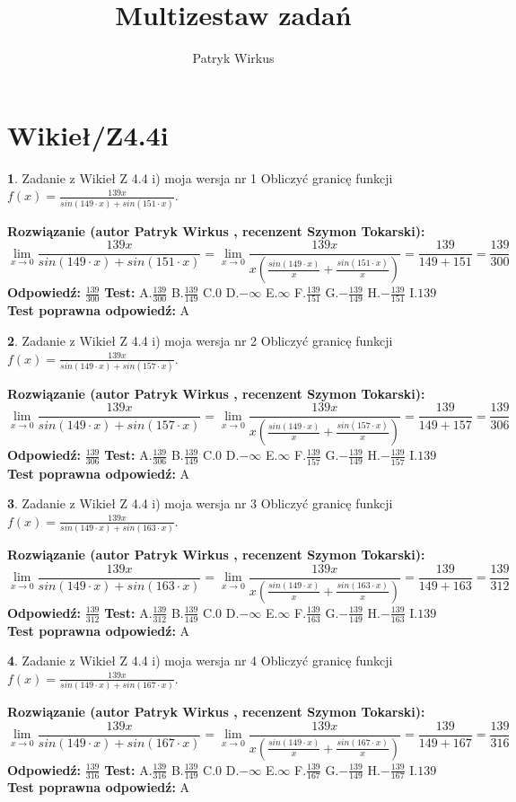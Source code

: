 \documentclass[12pt, a4paper]{article}
\title{Multizestaw zadań}
\author{Patryk Wirkus}
\date{}
\theoremstyle{definition} %
\newtheorem{zad}{}
\newcommand{\kategoria}[1]{\section{#1}}
\newcommand{\zadStart}[1]{\begin{zad}#1\newline}
\newcommand{\zadStop}{\end{zad}}
\newcommand{\rozwStart}[2]{\noindent \textbf{Rozwiązanie (autor #1 , recenzent #2): }\newline}
\newcommand{\rozwStop}{\newline}
\newcommand{\odpStart}{\noindent \textbf{Odpowiedź:}\newline}
\newcommand{\odpStop}{\newline}
\newcommand{\testStart}{\noindent \textbf{Test:}\newline}
\newcommand{\testStop}{\newline}
\newcommand{\kluczStart}{\noindent \textbf{Test poprawna odpowiedź:}\newline}
\newcommand{\kluczStop}{\newline}
\begin{document}
\maketitle

\kategoria{Wikieł/Z4.4i}


\zadStart{Zadanie z Wikieł Z 4.4 i) moja wersja nr 1}
Obliczyć granicę funkcji $f(x)=\frac{139x}{sin(149\cdot x) +sin(151\cdot x)}$.
\zadStop
\rozwStart{Patryk Wirkus}{Szymon Tokarski}
$$\lim\limits_{x\to 0}\frac{139x}{sin(149\cdot x) +sin(151\cdot x)}=\lim\limits_{x\to 0}\frac{139x}{x(\frac{sin(149\cdot x)}{x}+\frac{sin(151\cdot x)}{x})}=\frac{139}{149+151} = \frac{139}{300}$$
\rozwStop
\odpStart
$\frac{139}{300}$
\odpStop
\testStart
A.$\frac{139}{300}$
B.$\frac{139}{149}$
C.$0$
D.$-\infty$
E.$\infty$
F.$\frac{139}{151}$
G.$-\frac{139}{149}$
H.$-\frac{139}{151}$
I.$139$
\testStop
\kluczStart
A
\kluczStop



\zadStart{Zadanie z Wikieł Z 4.4 i) moja wersja nr 2}
Obliczyć granicę funkcji $f(x)=\frac{139x}{sin(149\cdot x) +sin(157\cdot x)}$.
\zadStop
\rozwStart{Patryk Wirkus}{Szymon Tokarski}
$$\lim\limits_{x\to 0}\frac{139x}{sin(149\cdot x) +sin(157\cdot x)}=\lim\limits_{x\to 0}\frac{139x}{x(\frac{sin(149\cdot x)}{x}+\frac{sin(157\cdot x)}{x})}=\frac{139}{149+157} = \frac{139}{306}$$
\rozwStop
\odpStart
$\frac{139}{306}$
\odpStop
\testStart
A.$\frac{139}{306}$
B.$\frac{139}{149}$
C.$0$
D.$-\infty$
E.$\infty$
F.$\frac{139}{157}$
G.$-\frac{139}{149}$
H.$-\frac{139}{157}$
I.$139$
\testStop
\kluczStart
A
\kluczStop



\zadStart{Zadanie z Wikieł Z 4.4 i) moja wersja nr 3}
Obliczyć granicę funkcji $f(x)=\frac{139x}{sin(149\cdot x) +sin(163\cdot x)}$.
\zadStop
\rozwStart{Patryk Wirkus}{Szymon Tokarski}
$$\lim\limits_{x\to 0}\frac{139x}{sin(149\cdot x) +sin(163\cdot x)}=\lim\limits_{x\to 0}\frac{139x}{x(\frac{sin(149\cdot x)}{x}+\frac{sin(163\cdot x)}{x})}=\frac{139}{149+163} = \frac{139}{312}$$
\rozwStop
\odpStart
$\frac{139}{312}$
\odpStop
\testStart
A.$\frac{139}{312}$
B.$\frac{139}{149}$
C.$0$
D.$-\infty$
E.$\infty$
F.$\frac{139}{163}$
G.$-\frac{139}{149}$
H.$-\frac{139}{163}$
I.$139$
\testStop
\kluczStart
A
\kluczStop



\zadStart{Zadanie z Wikieł Z 4.4 i) moja wersja nr 4}
Obliczyć granicę funkcji $f(x)=\frac{139x}{sin(149\cdot x) +sin(167\cdot x)}$.
\zadStop
\rozwStart{Patryk Wirkus}{Szymon Tokarski}
$$\lim\limits_{x\to 0}\frac{139x}{sin(149\cdot x) +sin(167\cdot x)}=\lim\limits_{x\to 0}\frac{139x}{x(\frac{sin(149\cdot x)}{x}+\frac{sin(167\cdot x)}{x})}=\frac{139}{149+167} = \frac{139}{316}$$
\rozwStop
\odpStart
$\frac{139}{316}$
\odpStop
\testStart
A.$\frac{139}{316}$
B.$\frac{139}{149}$
C.$0$
D.$-\infty$
E.$\infty$
F.$\frac{139}{167}$
G.$-\frac{139}{149}$
H.$-\frac{139}{167}$
I.$139$
\testStop
\kluczStart
A
\kluczStop
\end{document}
